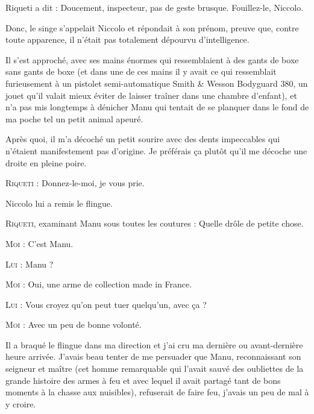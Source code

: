 Riqueti a dit : Doucement, inspecteur, pas de geste brusque. Fouillez-le, Niccolo.

Donc, le singe s’appelait Niccolo et répondait à son prénom, preuve que, contre toute apparence, il n’était pas totalement dépourvu d’intelligence.

\illusloflabel{}%
Il s’est approché, avec ses mains énormes qui ressemblaient à des gants de boxe sans gants de boxe (et dans une de ces mains il y avait ce qui ressemblait furieusement à un pistolet semi-automatique Smith \& Wesson Bodyguard 380, un jouet qu’il valait mieux éviter de laisser traîner dans une chambre d’enfant), et n’a pas mis longtemps à dénicher Manu qui tentait de se planquer dans le fond de ma poche tel un petit animal apeuré. 

Après quoi, il m’a décoché un petit sourire avec des dents impeccables qui n’étaient manifestement pas d’origine. Je préférais ça plutôt qu’il me décoche une droite en pleine poire.

\begin{dialogue}

\textsc{Riqueti} : Donnez-le-moi, je vous prie.

Niccolo lui a remis le flingue.

\textsc{Riqueti}, examinant Manu sous toutes les coutures : Quelle drôle de petite chose.

\textsc{Moi} : C’est Manu.

\textsc{Lui} : Manu ?

\textsc{Moi} : Oui, une arme de collection made in France.

\textsc{Lui} : Vous croyez qu’on peut tuer quelqu’un, avec ça ?

\textsc{Moi} : Avec un peu de bonne volonté.

\end{dialogue}

Il a braqué le flingue dans ma direction et j’ai cru ma dernière ou avant-dernière heure arrivée. J’avais beau tenter de me persuader que Manu, reconnaissant son seigneur et maître (cet homme remarquable qui l’avait sauvé des oubliettes de la grande histoire des armes à feu et avec lequel il avait partagé tant de bons moments à la chasse aux nuisibles), refuserait de faire feu, j’avais un peu de mal à y croire.


